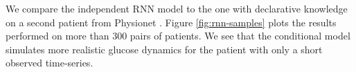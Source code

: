 We compare the independent RNN model to the one with declarative knowledge on a second patient from Physionet \citep{moody2001physionet}.
Figure \ref{fig:rnn-samples} plots the results performed on more than 300 pairs of patients.
We see that the conditional model simulates
more realistic glucose dynamics for the patient 
with only a short observed time-series.





